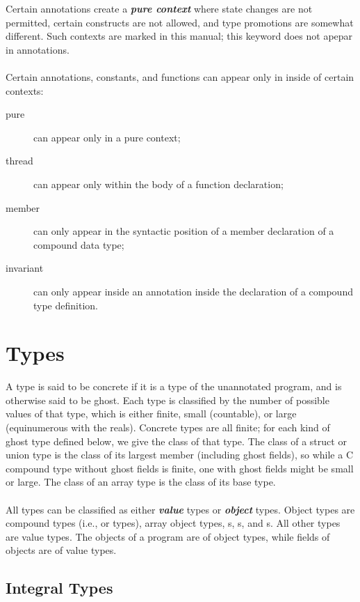 \documentclass[preprint,nocopyrightspace]{sigplanconf}
\newcommand{\Def}[1]{\textit{\textbf{#1}}}
\begin{document}
{{Certain annotations create a \Def{pure context} where state changes
are not permitted, certain constructs are not allowed, and type
promotions are somewhat different.  Such contexts are
marked  in this manual; this keyword does not apepar in
annotations.
\\\\
Certain annotations, constants, and functions can appear only in
inside of certain contexts: 
\begin{description}
\item[pure] can appear only in a pure context;
\item[thread] can appear only within the body of a function
declaration;
\item[member] can only appear in the syntactic position of a member
declaration of a compound data type;
\item[invariant] can only appear inside an  annotation
inside the declaration of a compound type definition.
\end{description}

\section{Types}
\label{sec:types}
A type is said to be concrete if it is a type of the unannotated program,
and is otherwise said to be ghost.
Each type is classified by the number of possible values of that type, which is
either finite, small (countable), or large (equinumerous with the
reals). Concrete types are all finite; for each kind of ghost type 
defined below, we give the class of that type. 
The class of a struct or union type is
the class of its largest member (including ghost fields), so while a C
compound type without ghost fields is finite, one with ghost fields
might be small or large. The class of an array type is the class of
its base type.
\\\\
All types can be classified as either \Def{value} types
or \Def{object} types. Object types are compound types (i.e., 
or  types), array object types, \vcc{\thread}s, 
\vcc{\claim}s, and \vcc{\blob}s. All other types are value
types. The objects of a program are of object types, while fields of
objects are of value types.

\subsection{Integral Types}

}}
\end{document}
